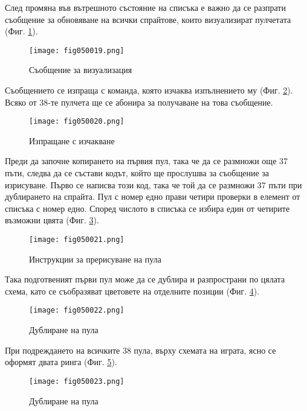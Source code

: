 След промяна във вътрешното състояние на списъка е важно да се разпрати съобщение за обновяване на всички спрайтове, които визуализират пулчетата (Фиг. \ref{fig050019}). 

\begin{figure}[H]
  \centering
  \texttt{[image: fig050019.png]}
  \caption{Съобщение за визуализация}
\label{fig050019}
\end{figure}

Съобщението се изпраща с команда, която изчаква изпълнението му (Фиг. \ref{fig050020}). Всяко от 38-те пулчета ще се абонира за получаване на това съобщение. 

\begin{figure}[H]
  \centering
  \texttt{[image: fig050020.png]}
  \caption{Изпращане с изчакване}
\label{fig050020}
\end{figure}

Преди да започне копирането на първия пул, така че да се размножи още 37 пъти, следва да се състави кодът, който ще прослушва за съобщение за изрисуване. Първо се написва този код, така че той да се размножи 37 пъти при дублирането на спрайта. Пул с номер едно прави четири проверки в елемент от списъка с номер едно. Според числото в списъка се избира един от четирите възможни цвята (Фиг. \ref{fig050021}).

\begin{figure}[H]
  \centering
  \texttt{[image: fig050021.png]}
  \caption{Инструкции за прерисуване на пула}
\label{fig050021}
\end{figure}

Така подготвеният първи пул може да се дублира и разпространи по цялата схема, като се съобразяват цветовете на отделните позиции (Фиг. \ref{fig050022}). 

\begin{figure}[H]
  \centering
  \texttt{[image: fig050022.png]}
  \caption{Дублиране на пула}
\label{fig050022}
\end{figure}

При подреждането на всичките 38 пула, върху схемата на играта, ясно се оформят двата ринга (Фиг. \ref{fig050023}).

\begin{figure}[H]
  \centering
  \texttt{[image: fig050023.png]}
  \caption{Дублиране на пула}
\label{fig050023}
\end{figure}

